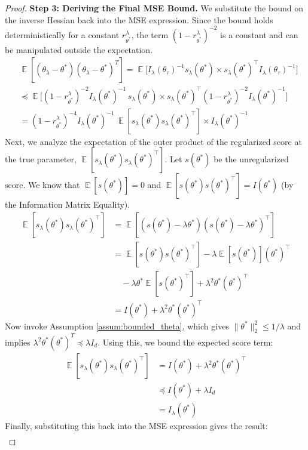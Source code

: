 \documentclass{article}
\DeclareMathOperator*{\E}{\mathbb{E}} %
\begin{document}
\begin{proof}
\textbf{Step 3: Deriving the Final MSE Bound.}
We substitute the bound on the inverse Hessian back into the MSE expression. Since the bound holds deterministically for a constant $r^{\lambda}_{\theta^*}$, the term $(1-r^{\lambda}_{\theta^*})^{-2}$ is a constant and can be manipulated outside the expectation.
\begin{align*}
&\E[(\theta_\lambda - \theta^*)(\theta_\lambda - \theta^*)^T] = \E\Big[I_\lambda(\theta_\tau)^{-1} s_\lambda(\theta^*) \times s_\lambda(\theta^*)^\top I_\lambda(\theta_\tau)^{-1}\Big] \\
&\preceq \E\Big[ (1-r^{\lambda}_{\theta^*})^{-2} I_\lambda(\theta^*)^{-1} \, s_\lambda(\theta^*)  \times s_\lambda(\theta^*)^\top (1-r^{\lambda}_{\theta^*})^{-2} I_\lambda(\theta^*)^{-1} \Big] \\
&= (1-r^{\lambda}_{\theta^*})^{-4} I_\lambda(\theta^*)^{-1} \, \E[s_\lambda(\theta^*) s_\lambda(\theta^*)^\top]  \times I_\lambda(\theta^*)^{-1}
\end{align*}
Next, we analyze the expectation of the outer product of the regularized score at the true parameter, $\E[s_\lambda(\theta^*) s_\lambda(\theta^*)^\top]$. Let $s(\theta^*)$ be the unregularized score. We know that $\E[s(\theta^*)] = 0$ and $\E[s(\theta^*)s(\theta^*)^\top] = I(\theta^*)$ (by the Information Matrix Equality).
\begin{align*}
\E[s_\lambda(\theta^*) s_\lambda(\theta^*)^\top]
&= \E[(s(\theta^*) - \lambda\theta^*)(s(\theta^*) - \lambda\theta^*)^\top] \\
&= \E[s(\theta^*)s(\theta^*)^\top] - \lambda\E[s(\theta^*)](\theta^*)^\top \\
&\quad - \lambda\theta^*\E[s(\theta^*)^\top] + \lambda^2\theta^*(\theta^*)^\top \\
&= I(\theta^*) + \lambda^2\theta^*(\theta^*)^\top
\end{align*}
Now invoke Assumption \ref{assum:bounded_theta}, which gives $\|\theta^*\|^2_2 \leq 1/\lambda$ and implies $\lambda^2 \theta^* (\theta^*)^T \preceq \lambda I_d$. Using this, we bound the expected score term:
\begin{align*}
\E[s_\lambda(\theta^*) s_\lambda(\theta^*)^\top]
&= I(\theta^*) + \lambda^2\theta^*(\theta^*)^\top \\
&\preceq I(\theta^*) + \lambda I_d \\
&= I_\lambda(\theta^*)
\end{align*}
Finally, substituting this back into the MSE expression gives the result:
\begin{align*}

\end{align*}
\end{proof}
\end{document}
